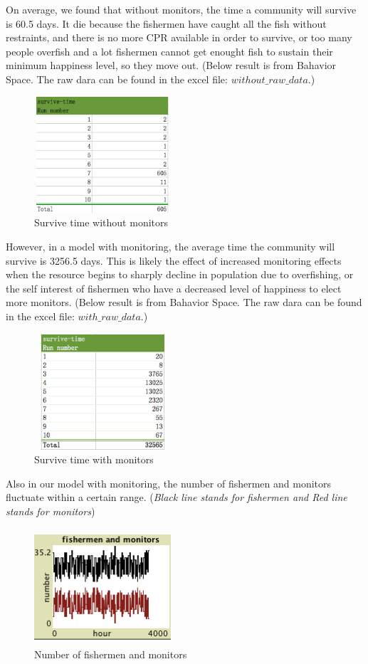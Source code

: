 \documentclass[12pt]{article}
\begin{document}
On average, we found that without monitors, the  time a community will survive is 60.5 days. It die because the fishermen have caught all the fish without restraints, and there is no more CPR available in order to survive, or too many people overfish and a lot fishermen cannot get enought fish to sustain their minimum happiness level, so they move out. (Below result is from Bahavior Space. The raw dara can be found in the excel file: $without\_raw\_data$.)
\begin{figure}[!h]\centering
	\caption{Survive time without monitors}
	\includegraphics[width=2in,height=1.7in]{r1}
\end{figure}


However, in a model with monitoring, the average time the community will survive is 3256.5 days. This is likely the effect of increased monitoring effects when the resource begins to sharply decline in population due to overfishing, or the self interest of fishermen who have a decreased level of happiness to elect more monitors. (Below result is from Bahavior Space. The raw dara can be found in the excel file: $with\_raw\_data$.)
\begin{figure}[!h]\centering
	\caption{Survive time with monitors}
	\includegraphics[width=2in,height=1.7in]{r2}
\end{figure}

Also in our model with monitoring, the number of fishermen and monitors fluctuate within a certain range. (\textit{Black line stands for fishermen and Red line stands for monitors})
\begin{figure}[!h]\centering
	\caption{Number of fishermen and monitors}
	\includegraphics[width=2in,height=1.7in]{fm}
\end{figure}
\end{document}
